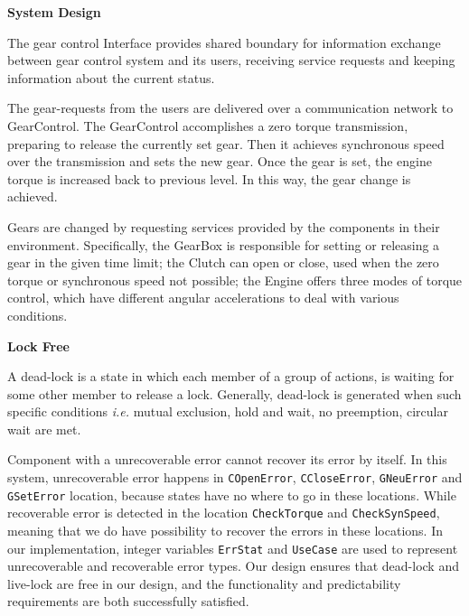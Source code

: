 \documentclass[a4paper]{article}
\begin{document}
\vspace{2mm}
\begin{center}
\large\textbf{System Design} \\
\end{center}

\large{
The gear control \textsf{Interface} provides shared boundary for information exchange between gear control system and its users, receiving service requests and keeping information about the current status.

The gear-requests from the users are delivered over a communication network to \textsf{GearControl}. The \textsf{GearControl} accomplishes a zero torque transmission, preparing to release the currently set gear. Then it achieves synchronous speed over the transmission and sets the new gear. Once the gear is set, the engine torque is increased back to previous level. In this way, the gear change is achieved. 

Gears are changed by requesting services provided by the components in their environment. Specifically, the \textsf{GearBox} is responsible for setting or releasing a gear in the given time limit; the \textsf{Clutch} can open or close, used when the zero torque or synchronous speed not possible; the \textsf{Engine} offers three modes of torque control, which have different angular accelerations to deal with various conditions. }

\vspace{2mm}
\begin{center}
\large\textbf{Lock Free} \\
\end{center}

\large{
A dead-lock is a state in which each member of a group of actions, is waiting for some other member to release a lock. Generally, dead-lock is generated when such specific conditions \textit{i.e.} mutual exclusion, hold and wait, no preemption, circular wait are met.

Component with a unrecoverable error cannot recover its error by itself. In this system, unrecoverable error happens in \texttt{COpenError}, \texttt{CCloseError}, \texttt{GNeuError} and \texttt{GSetError} location, because states have no where to go in these locations. While recoverable error is detected in the location \texttt{CheckTorque} and \texttt{CheckSynSpeed}, meaning that we do have possibility to recover the errors in these locations. In our implementation, integer variables \texttt{ErrStat} and \texttt{UseCase} are used to represent unrecoverable and recoverable error types. Our design ensures that dead-lock and live-lock are free in our design, and the functionality and predictability requirements are both successfully satisfied.}
\end{document}
